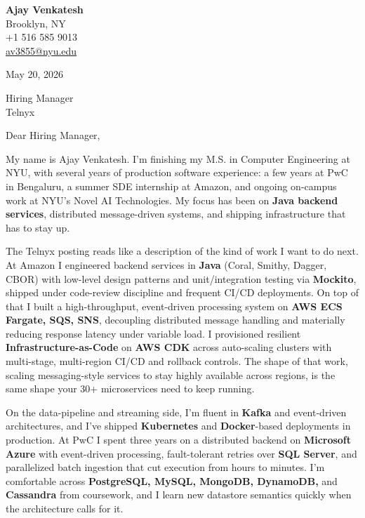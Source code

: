 \documentclass[letterpaper,11pt]{article}
\begin{document}
\begin{flushleft}
\textbf{\large Ajay Venkatesh} \\
Brooklyn, NY \\
+1 516 585 9013 \\
\href{mailto:av3855@nyu.edu}{av3855@nyu.edu}
\end{flushleft}

\vspace{10pt}

May 20, 2026

\vspace{6pt}

Hiring Manager \\
Telnyx

\vspace{10pt}

Dear Hiring Manager,

My name is Ajay Venkatesh. I'm finishing my M.S. in Computer Engineering at NYU, with several years of production software experience: a few years at PwC in Bengaluru, a summer SDE internship at Amazon, and ongoing on-campus work at NYU's Novel AI Technologies. My focus has been on \textbf{Java backend services}, distributed message-driven systems, and shipping infrastructure that has to stay up.

The Telnyx posting reads like a description of the kind of work I want to do next. At Amazon I engineered backend services in \textbf{Java} (Coral, Smithy, Dagger, CBOR) with low-level design patterns and unit/integration testing via \textbf{Mockito}, shipped under code-review discipline and frequent CI/CD deployments. On top of that I built a high-throughput, event-driven processing system on \textbf{AWS ECS Fargate, SQS, SNS}, decoupling distributed message handling and materially reducing response latency under variable load. I provisioned resilient \textbf{Infrastructure-as-Code} on \textbf{AWS CDK} across auto-scaling clusters with multi-stage, multi-region CI/CD and rollback controls. The shape of that work, scaling messaging-style services to stay highly available across regions, is the same shape your 30+ microservices need to keep running.

On the data-pipeline and streaming side, I'm fluent in \textbf{Kafka} and event-driven architectures, and I've shipped \textbf{Kubernetes} and \textbf{Docker}-based deployments in production. At PwC I spent three years on a distributed backend on \textbf{Microsoft Azure} with event-driven processing, fault-tolerant retries over \textbf{SQL Server}, and parallelized batch ingestion that cut execution from hours to minutes. I'm comfortable across \textbf{PostgreSQL, MySQL, MongoDB, DynamoDB,} and \textbf{Cassandra} from coursework, and I learn new datastore semantics quickly when the architecture calls for it.
\end{document}
